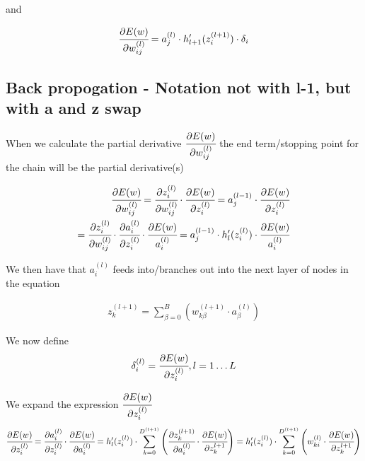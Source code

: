 \documentclass[12pt,a4paper]{report}
\begin{document}
and

\setcounter{equation}{0}
\begin{align*}
\cfrac{\partial E(w)}{\partial w_{ij}^{(l)}} = a_{j}^{(l)} \cdot h'_{l+1}(z_{i}^{(l+1)}) \cdot \delta_{i}
\end{align*}





\subsection*{Back propogation - Notation not with l-1, but with a and z swap}


When we calculate the partial derivative $\cfrac{\partial E(w)^{}}{\partial w_{ij}^{(l)}}$
the end term/stopping point for the chain will be the partial derivative(s)

\setcounter{equation}{0}
\begin{align*}
\cfrac{\partial E(w)}{\partial w_{ij}^{(l)}} = \cfrac{\partial z_{i}^{(l)}}{\partial w_{ij}^{(l)}} \cdot \cfrac{\partial E(w)}{\partial z_{i}^{(l)}} = a_{j}^{(l-1)} \cdot \cfrac{\partial E(w)}{\partial z_{i}^{(l)}} \\
= \cfrac{\partial z_{i}^{(l)}}{\partial w_{ij}^{(l)}} \cdot \cfrac{\partial a_{i}^{(l)}}{\partial z_{i}^{(l)}} \cdot \cfrac{\partial E(w)}{a_{i}^{(l)}} = a_{j}^{(l-1)} \cdot h_{l}'(z_{i}^{(l)}) \cdot \cfrac{\partial E(w)}{a_{i}^{(l)}} 
\end{align*}

We then have that \(a_{i}^{(l)}\) feeds into/branches out into the next layer of nodes in the equation

\setcounter{equation}{0}
\begin{align*}
z_{k}^{(l+1)} = \sum_{\beta=0}^{B} \left(w_{k\beta}^{(l+1)} \cdot a_{\beta}^{(l)}\right)
\end{align*}

We now define
\setcounter{equation}{0}
\begin{align*}
	\delta_{i}^{(l)} = \cfrac{\partial E(w)}{\partial z_{i}^{(l)}}, l = 1\dots L \\
\end{align*}

We expand the expression $\cfrac{\partial E(w)}{\partial z_{i}^{(l)}}$
\begin{align*}
	\cfrac{\partial E(w)}{\partial z_{i}^{(l)}} =
	\cfrac{\partial a_{i}^{(l)}}{\partial z_{i}^{(l)}} \cdot \cfrac{\partial E(w)}{\partial a_{i}^{(l)}} 
	=  h'_{l}(z_{i}^{(l)}) \cdot \sum_{k=0}^{D^{(l+1)}} \left(\cfrac{\partial z_{k}^{(l+1)}}{\partial a_{i}^{(l)}} \cdot \cfrac{\partial E(w)}{\partial z_{k}^{l+1}}\right) 
	=  h'_{l}(z_{i}^{(l)}) \cdot \sum_{k=0}^{D^{(l+1)}} \left(w_{ki}^{(l)} \cdot \cfrac{\partial E(w)}{\partial z_{k}^{l+1}}\right) 
\end{align*}
\end{document}
